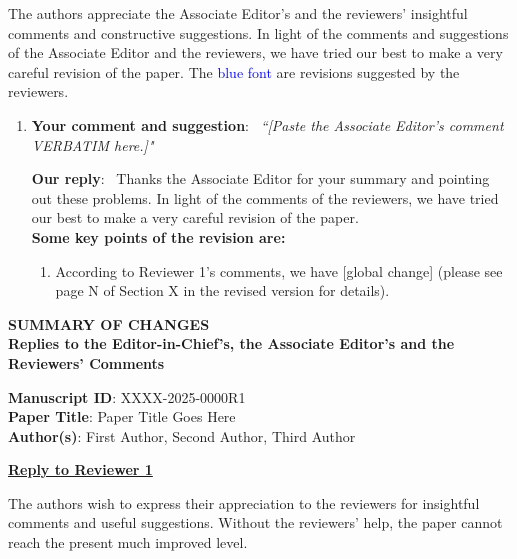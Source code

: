 \documentclass[letter,onecolumn,11pt]{IEEEtran}
\newcommand{\msid}{XXXX-2025-0000R1}                 %
\newcommand{\papertitle}{Paper Title Goes Here}      %
\newcommand{\authors}{First Author, Second Author, Third Author}  %
\newcommand{\soheader}{%
  \begin{center}
  {\LARGE \textbf{SUMMARY OF CHANGES}}\vspace{2ex}\\
  {\LARGE \textbf{Replies to the Editor-in-Chief's, the Associate
  Editor's and the Reviewers' Comments}}
  \end{center}
  \bigskip
  \noindent
  \textbf{Manuscript ID}: \msid\\
  \textbf{Paper Title}: \papertitle\\
  \textbf{Author(s)}: \authors
}
\newcommand{\recipient}[1]{\vspace{4ex} \noindent \underline{\Large \textbf{#1}}}
\begin{document}
\vspace{2ex} The authors appreciate the Associate Editor's and the reviewers' insightful comments and constructive suggestions. In light of the comments and suggestions of the Associate Editor and the reviewers, we have tried our best to make a very careful revision of the paper. The \textcolor{blue}{blue font} are revisions suggested by the reviewers.

\vspace{2ex}
\begin{enumerate}[1)]
\item[0)] \textbf{Your comment and suggestion}: \ \textit{``[Paste the Associate Editor's comment VERBATIM here.]"}
\vspace{2ex}

\textbf{Our reply}: \ Thanks the Associate Editor for your summary and pointing out these problems. In light of the comments of the reviewers, we have tried our best to make a very careful revision of the paper. \\

\vspace{2ex}
\textbf{Some key points of the revision are:}
\vspace{2ex}
\begin{enumerate}[$\bullet$]
\item According to Reviewer 1's comments, we have [global change] (please see page N of Section X in the revised version for details).
\end{enumerate}
\end{enumerate}

\vfill\newpage
\soheader
\recipient{Reply to Reviewer 1}

\vspace{2ex} The authors wish to express their appreciation to the reviewers for insightful comments and useful suggestions. Without the reviewers' help, the paper cannot reach the present much improved level.
\end{document}
